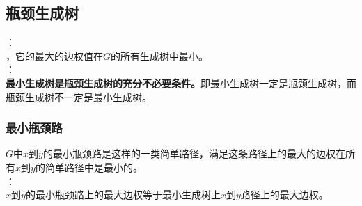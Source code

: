 \documentclass[a4paper]{book}
\begin{document}
\subsection{瓶颈生成树}
：\\
，它的最大的边权值在$G$的所有生成树中最小。\\
：\\
\indent\textbf{最小生成树是瓶颈生成树的充分不必要条件。}即最小生成树一定是瓶颈生成树，而瓶颈生成树不一定是最小生成树。
\subsubsection{最小瓶颈路}
$G$中$x$到$y$的最小瓶颈路是这样的一类简单路径，满足这条路径上的最大的边权在所有$x$到$y$的简单路径中是最小的。\\
：\\
\indent $x$到$y$的最小瓶颈路上的最大边权等于最小生成树上$x$到$y$路径上的最大边权。
\end{document}
